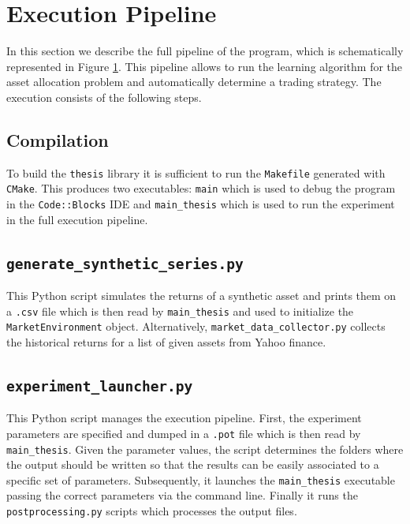 \section{Execution Pipeline}
\label{sec:execution_pipeline}

In this section we describe the full pipeline of the program, which is schematically represented in Figure \ref{sec:execution_pipeline}. This pipeline allows to run the learning algorithm for the asset allocation problem and automatically determine a trading strategy. The execution consists of the following steps. 

\subsection{Compilation} To build the \lstinline{thesis} library it is sufficient to run the \lstinline{Makefile} generated with \lstinline{CMake}. This produces two executables: \lstinline{main} which is used to debug the program in the \lstinline{Code::Blocks} IDE and \lstinline{main_thesis} which is used to run the experiment in the full execution pipeline. 

\subsection{\lstinline{generate_synthetic_series.py}} This Python script simulates the returns of a synthetic asset and prints them on a \lstinline{.csv} file which is then read by \lstinline{main_thesis} and used to initialize the \lstinline{MarketEnvironment} object. Alternatively, \lstinline{market_data_collector.py} collects the historical returns for a list of given assets from Yahoo finance.

\subsection{\lstinline{experiment_launcher.py}} This Python script manages the execution pipeline. First, the experiment parameters are specified and dumped in a \lstinline{.pot} file which is then read by \lstinline{main_thesis}. Given the parameter values, the script determines the folders where the output should be written so that the results can be easily associated to a specific set of parameters. Subsequently, it launches the \lstinline{main_thesis} executable passing the correct parameters via the command line. Finally it runs the \lstinline{postprocessing.py} scripts which processes the output files.  

